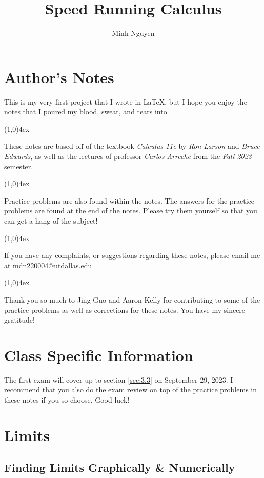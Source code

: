 \documentclass{MathNotes}
\title{Speed Running Calculus}
\author{Minh Nguyen}
\newcommand{\br}{
\begin{center}
\line(1,0){4ex}
\end{center}}
\begin{document}
\newpage
\maketitle
{}
\tableofcontents
\newpage
\section*{Author's Notes}
This is my very first project that I wrote in \LaTeX, but I hope you enjoy
the notes that I poured my blood, sweat, and tears into  
\br
These notes are based off of the textbook \textit{Calculus 11e} by 
\textit{Ron Larson} and \textit{Bruce Edwards}, as well as the lectures of 
professor \textit{Carlos Arreche} from the \textit{Fall 2023} semester.
\br
Practice problems are also found within the notes. The answers for the practice
problems are found at the end of the notes. Please try them yourself so that
you can get a hang of the subject!
\br
If you have any complaints, or suggestions regarding these notes, please
email me at \newline\href{mailto:minh.nguyen7@utdallas.edu}{mdn220004@utdallas.edu}
\br
Thank you so much to Jing Guo and Aaron Kelly for contributing to some of the
practice problems as well as corrections for these notes. You have my sincere
gratitude!

\section*{Class Specific Information}
The first exam will cover up to section \ref{sec:3.3} on September 29, 2023.
I recommend that you also do the exam review on top of the practice problems
in these notes if you so choose. Good luck!
\newpage
{}

\section{Limits}\label{sec:1}
\subsection{Finding Limits Graphically \& Numerically}
\end{document}
